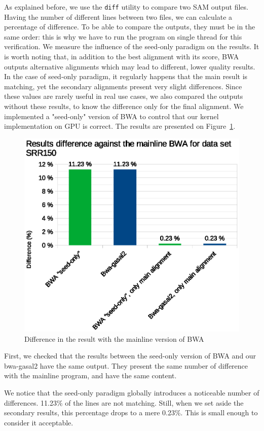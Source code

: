 
As explained before, we use the \verb|diff| utility to compare two SAM output files. Having the number of different lines between two files, we can calculate a percentage of difference. To be able to compare the outputs, they must be in the same order: this is why we have to run the program on single thread for this verification. We measure the influence of the seed-only paradigm on the results. It is worth noting that, in addition to the best alignment with its score, BWA outputs alternative alignments which may lead to different, lower quality results. In the case of seed-only paradigm, it regularly happens that the main result is matching, yet the secondary alignments present very slight differences. Since these values are rarely useful in real use cases, we also compared the outputs without these results, to know the difference only for the final alignment. We implemented a "seed-only" version of BWA to control that our kernel implementation on GPU is correct. The results are presented on Figure~\ref{fig:result-diff-srr150}.

\begin{figure}[h!]
	\centering
	\includegraphics[width=1\linewidth]{srr150/result-diff-srr150}
	\caption{Difference in the result with the mainline version of BWA}
	\label{fig:result-diff-srr150}
\end{figure}

First, we checked that the results between the seed-only version of BWA and our bwa-gasal2 have the same output. They present the same number of difference with the mainline program, and have the same content.

We notice that the seed-only paradigm globally introduces a noticeable number of differences. 11.23\% of the lines are not matching. Still, when we set aside the secondary results, this percentage drops to a mere 0.23\%. This is small enough to consider it acceptable.


